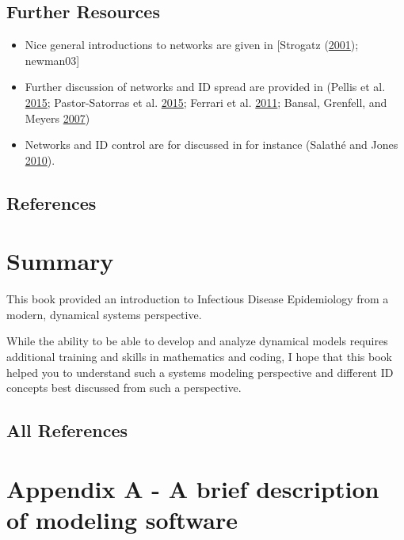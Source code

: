 \documentclass[
]{book}
\providecommand{\tightlist}{%
  \setlength{\itemsep}{0pt}\setlength{\parskip}{0pt}}
\begin{document}
\hypertarget{further-resources-17}{%
\section{Further Resources}\label{further-resources-17}}

\begin{itemize}
\tightlist
\item
  Nice general introductions to networks are given in {[}Strogatz (\protect\hyperlink{ref-strogatz01}{2001}); newman03{]}
\item
  Further discussion of networks and ID spread are provided in (Pellis et al. \protect\hyperlink{ref-pellis15}{2015}; Pastor-Satorras et al. \protect\hyperlink{ref-pastor-satorras15}{2015}; Ferrari et al. \protect\hyperlink{ref-ferrari11}{2011}; Bansal, Grenfell, and Meyers \protect\hyperlink{ref-bansal07}{2007})
\item
  Networks and ID control are for discussed in for instance (Salathé and Jones \protect\hyperlink{ref-salathe10}{2010}).
\end{itemize}

\hypertarget{references-18}{%
\section{References}\label{references-18}}

\hypertarget{summary}{%
\chapter{Summary}\label{summary}}

This book provided an introduction to Infectious Disease Epidemiology from a modern, dynamical systems perspective.

While the ability to be able to develop and analyze dynamical models requires additional training and skills in mathematics and coding, I hope that this book helped you to understand such a systems modeling perspective and different ID concepts best discussed from such a perspective.

\hypertarget{all-references}{%
\section{All References}\label{all-references}}

\hypertarget{appendix-a---a-brief-description-of-modeling-software}{%
\chapter{Appendix A - A brief description of modeling software}\label{appendix-a---a-brief-description-of-modeling-software}}
\end{document}

